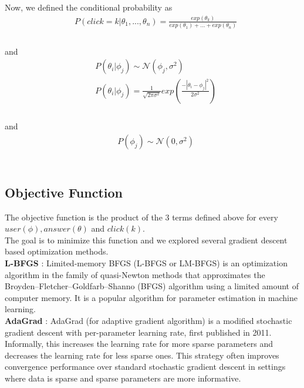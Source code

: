\documentclass{article}
\begin{document}
Now, we defined the conditional probability as \\
\begin{equation*}
\begin{split}
    &P(click = k | \theta_1, ..., \theta_n) = \frac{exp(\theta_k)}{exp(\theta_1) + ... + exp(\theta_n)} \\
\end{split}
\end{equation*}\\
and \\
\begin{equation*}
\begin{split}
    &P(\theta_i | \phi_j) \sim \mathcal{N}(\phi_j, \sigma^2) \\
    &P(\theta_i | \phi_j) = \frac{1}{\sqrt{2\pi\sigma^2}} exp(\frac{-|\theta_i - \phi_j|^2}{2\sigma^2}) \\
\end{split}
\end{equation*}\\
and \\
\begin{equation*}
\begin{split}
    &P(\phi_j) \sim \mathcal{N}(0, \sigma^2) \\
\end{split}
\end{equation*}\\

\subsection{Objective Function}
The objective function is the product of the 3 terms defined above for every 
$user(\phi), answer(\theta)$ and $click(k)$. \\ 

The goal is to minimize this function and we explored several gradient descent based
optimization methods. \\
\textbf{L-BFGS} : Limited-memory BFGS (L-BFGS or LM-BFGS) is an optimization 
algorithm in the family of quasi-Newton methods that approximates the 
Broyden–Fletcher–Goldfarb–Shanno (BFGS) algorithm using a limited amount
of computer memory. It is a popular algorithm for parameter estimation in 
machine learning. \\
\textbf{AdaGrad} : AdaGrad (for adaptive gradient algorithm) is a modified 
stochastic gradient descent with per-parameter learning rate, first 
published in 2011. Informally, this increases the learning 
rate for more sparse parameters and decreases the learning rate for less 
sparse ones. This strategy often improves convergence performance over 
standard stochastic gradient descent in settings where data is sparse and 
sparse parameters are more informative. \\
\end{document}
